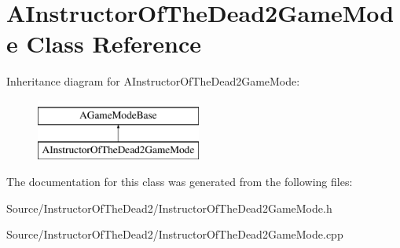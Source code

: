 \hypertarget{class_a_instructor_of_the_dead2_game_mode}{}\section{A\+Instructor\+Of\+The\+Dead2\+Game\+Mode Class Reference}
\label{class_a_instructor_of_the_dead2_game_mode}
Inheritance diagram for A\+Instructor\+Of\+The\+Dead2\+Game\+Mode\+:\begin{figure}[H]
\begin{center}
\leavevmode
\includegraphics[height=2.000000cm]{class_a_instructor_of_the_dead2_game_mode}
\end{center}
\end{figure}


The documentation for this class was generated from the following files\+:\begin{DoxyCompactItemize}
\item 
Source/\+Instructor\+Of\+The\+Dead2/Instructor\+Of\+The\+Dead2\+Game\+Mode.\+h\item 
Source/\+Instructor\+Of\+The\+Dead2/Instructor\+Of\+The\+Dead2\+Game\+Mode.\+cpp\end{DoxyCompactItemize}
